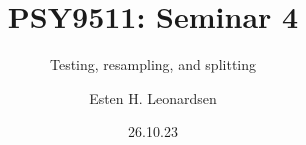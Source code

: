 \documentclass[10pt]{beamer}
\title{PSY9511: Seminar 4}
\subtitle{Testing, resampling, and splitting}
\author{Esten H. Leonardsen}
\date{26.10.23}
\newcommand{\PythonInputNode}[6]{%
    \node[
        minimum width=#4,
        text width=#4,
        align=left,
        inner sep=0pt,
        outer sep=0pt,
        anchor=north west,
        label={[blue,
                anchor=north east,
                font=\ttfamily\fontsize{\the\numexpr#5-1\relax}{#5}\selectfont,
                inner sep=0pt,
                outer sep=0pt,
                xshift=-3pt,
                yshift=-3pt
                ]north west:In{[}#1{]}:},
    ] (#3) at #2 {
    \begin{lstlisting}[
        style=PythonInput,
        linewidth=#4,
        basicstyle=\ttfamily\fontsize{\the\numexpr#5-1\relax}{#5}\selectfont,
        numberstyle=\fontsize{\the\numexpr#5-1\relax}{#5}\selectfont\color[RGB]{128, 128, 128},
    ]^^J
        #6
    \end{lstlisting}
    };
}
\begin{document}
	\begin{frame}
	 	\titlepage
	\end{frame}



\end{document}
